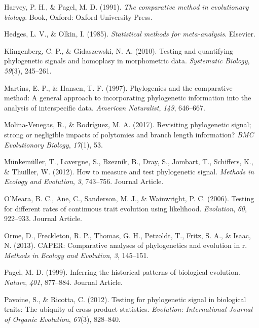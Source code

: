\documentclass[
]{article}
\begin{document}
\leavevmode\hypertarget{ref-HarveyPagel1991}{}%
Harvey, P. H., \& Pagel, M. D. (1991). \emph{The comparative method in
evolutionary biology}. Book, Oxford: Oxford University Press.

\leavevmode\hypertarget{ref-HedgesOlkin1985}{}%
Hedges, L. V., \& Olkin, I. (1985). \emph{Statistical methods for
meta-analysis}. Elsevier.

\leavevmode\hypertarget{ref-Klingenberg2010}{}%
Klingenberg, C. P., \& Gidaszewski, N. A. (2010). Testing and
quantifying phylogenetic signals and homoplasy in morphometric data.
\emph{Systematic Biology}, \emph{59}(3), 245--261.

\leavevmode\hypertarget{ref-MartinsHansen1997}{}%
Martins, E. P., \& Hansen, T. F. (1997). Phylogenies and the comparative
method: A general approach to incorporating phylogenetic information
into the analysis of interspecific data. \emph{American Naturalist},
\emph{149}, 646--667.

\leavevmode\hypertarget{ref-MolinaVenegas2017}{}%
Molina-Venegas, R., \& Rodríguez, M. A. (2017). Revisiting phylogenetic
signal; strong or negligible impacts of polytomies and branch length
information? \emph{BMC Evolutionary Biology}, \emph{17}(1), 53.

\leavevmode\hypertarget{ref-Munkemuller_et_al2012}{}%
Münkemüller, T., Lavergne, S., Bzeznik, B., Dray, S., Jombart, T.,
Schiffers, K., \& Thuiller, W. (2012). How to measure and test
phylogenetic signal. \emph{Methods in Ecology and Evolution}, \emph{3},
743--756. Journal Article.

\leavevmode\hypertarget{ref-OMeara_et_al2006}{}%
O'Meara, B. C., Ane, C., Sanderson, M. J., \& Wainwright, P. C. (2006).
Testing for different rates of continuous trait evolution using
likelihood. \emph{Evolution}, \emph{60}, 922--933. Journal Article.

\leavevmode\hypertarget{ref-Orme2013}{}%
Orme, D., Freckleton, R. P., Thomas, G. H., Petzoldt, T., Fritz, S. A.,
\& Isaac, N. (2013). CAPER: Comparative analyses of phylogenetics and
evolution in r. \emph{Methods in Ecology and Evolution}, \emph{3},
145--151.

\leavevmode\hypertarget{ref-Pagel1999}{}%
Pagel, M. D. (1999). Inferring the historical patterns of biological
evolution. \emph{Nature}, \emph{401}, 877--884. Journal Article.

\leavevmode\hypertarget{ref-Pavoine2012}{}%
Pavoine, S., \& Ricotta, C. (2012). Testing for phylogenetic signal in
biological traits: The ubiquity of cross-product statistics.
\emph{Evolution: International Journal of Organic Evolution},
\emph{67}(3), 828--840.
\end{document}
